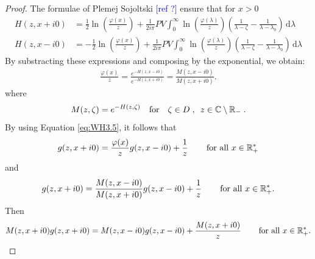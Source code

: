 \documentclass[11pt]{amsart}
\newcommand{\cte}{}
\newcommand{\diff}{\,\mathrm{d}}
\newcommand{\ndr}[1]{\textcolor{blue}{[#1]}}
\begin{document}
\begin{proof}
The formulae of Plemej Sojoltski \ndr{ref ?} ensure that for $x > 0$
    \begin{align*}
        H(z,x+i0) &= \frac{1}{2} \ln\left(\frac{\varphi(x)}{z}\right) + \frac{1}{2i\pi } PV\int_0^\infty \ln\left(\frac{\varphi(\lambda)}{z}\right) \left( \frac{1}{\lambda-\zeta} - \frac{1}{\lambda-\lambda_0}\right) \diff \lambda\\
        H(z,x-i0) &= -\frac{1}{2} \ln\left(\frac{\varphi(x)}{z}\right) + \frac{1}{2i\pi } PV\int_0^\infty \ln\left(\frac{\varphi(\lambda)}{z}\right)\left( \frac{1}{\lambda-\zeta} - \frac{1}{\lambda-\lambda_0}\right) \diff \lambda
    \end{align*}
By substracting these expressions and composing by the exponential, we obtain:
\begin{align*}
    \frac{\varphi(x)}{z}
    = \frac{e^{-H(z,x-i0)}}{e^{-H(z,x+i0)}} 
    = \frac{M(z,x-i0)}{M(z,x+i0)}.
\end{align*}
where 
\begin{equation}
    M(z,\zeta) = e^{-H(z,\zeta)}
    \quad \text{for} \quad
    \zeta \in D
    \; , \enspace z \in \mathbb{C} \setminus \mathbb{R}_- \; .
    \label{def:M}
\end{equation}
By using Equation \eqref{eq:WH3.5}, it follows that 
\begin{align*}
    g(z, x+i0) = \frac{\varphi(x)}{z} g(z, x-i0) + \frac{1}{z} \, \qquad \text{for all $x\in\mathbb{R}_+^*$}
\end{align*}
and 
\begin{align*}
    g(z, x+i0) = \frac{M(z,x-i0)}{M(z,x+i0)} g(z, x-i0) + \frac{1}{z} \, \qquad \text{for all $x\in\mathbb{R}_+^*$}.
\end{align*}
Then 
\begin{align*}
    M(z,x+i0)g(z, x+i0) = M(z,x-i0)g(z, x-i0) + \frac{M(z,x+i0)}{\cte  z} \, \qquad \text{for all $x\in\RR_+^*$}.
\end{align*}


\end{proof}
\end{document}
